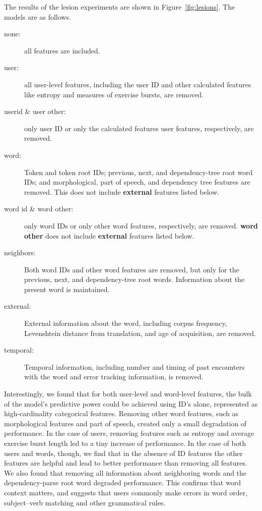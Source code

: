 \documentclass[11pt,a4paper]{article}
\begin{document}
The results of the lesion experiments are shown in Figure~\ref{fig:lesions}. The
models are as follows.
\begin{description}
  \item[none:] all features are included.  
  \item[user:] all user-level features, including the user ID and other
    calculated features like entropy and measures of exercise bursts, are
    removed.
  \item[userid \& user other:] only user ID or only the calculated
    features user features, respectively, are removed.
  \item[word:] Token and token root IDs; previous, next, and dependency-tree
    root word IDs; and morphological, part of speech, and dependency tree
    features are removed. This does not include {\bf external} features listed below.
  \item[word id \& word other:] only word IDs or only other
    word features, respectively, are removed. {\bf word other} does not include {\bf external} features listed below.
  \item[neighbors:] Both word IDs and other word features are removed, but
    only for the previous, next, and dependency-tree root words. Information
    about the present word is maintained.
  \item[external:] External information about the word, including corpus
    frequency, Levenshtein distance from translation, and age of acquisition,
    are removed.
  \item[temporal:] Temporal information, including number and timing of
    past encounters with the word and error tracking information, is removed.
\end{description}

Interestingly, we found that for both user-level and word-level features, the
bulk of the model's predictive power could be achieved using ID's alone,
represented as high-cardinality categorical features. Removing other word features,
such as morphological features and part of speech, created only a small
degradation of performance. In the case of users, removing features such as
entropy and average exercise burst length led to a tiny increase of performance.
In the case of both users and words, though, we find that in the absence of ID
features the other features are helpful and lead to better performance than
removing all features. We also found that removing all information about
neighboring words and the dependency-parse root word degraded performance. This
confirms that word context matters, and suggests that users commonly make errors in word order,
subject--verb matching and other grammatical rules.
\end{document}

